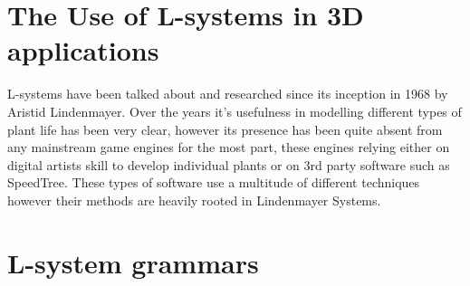 \section{The Use of L-systems in 3D applications}

L-systems have been talked about and researched since its inception in 1968 by Aristid Lindenmayer. Over the years it's usefulness in modelling different types of plant life has been very clear, however its presence has been quite absent from any mainstream game engines for the most part, these engines relying either on digital artists skill to develop individual plants or on 3rd party software such as SpeedTree. These types of software use a multitude of different techniques however their methods are heavily rooted in Lindenmayer Systems. 

\section{L-system grammars}

